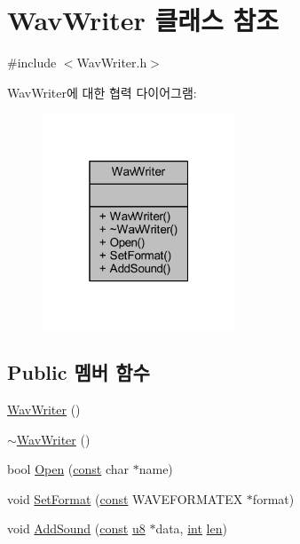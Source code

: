 \hypertarget{class_wav_writer}{}\section{Wav\+Writer 클래스 참조}
\label{class_wav_writer}


{\ttfamily \#include $<$Wav\+Writer.\+h$>$}



Wav\+Writer에 대한 협력 다이어그램\+:\nopagebreak
\begin{figure}[H]
\begin{center}
\leavevmode
\includegraphics[width=163pt]{class_wav_writer__coll__graph}
\end{center}
\end{figure}
\subsection*{Public 멤버 함수}
\begin{DoxyCompactItemize}
\item 
\mbox{\hyperlink{class_wav_writer_ada0f985bd68570f6d55442f96f3bda44}{Wav\+Writer}} ()
\item 
\mbox{\hyperlink{class_wav_writer_a53a03ef60fc6635381d059beaa6f0657}{$\sim$\+Wav\+Writer}} ()
\item 
bool \mbox{\hyperlink{class_wav_writer_a18a057d0c1901caa6b08f528bd6908a7}{Open}} (\mbox{\hyperlink{getopt1_8c_a2c212835823e3c54a8ab6d95c652660e}{const}} char $\ast$name)
\item 
void \mbox{\hyperlink{class_wav_writer_a04fe7187eebeff2831af0bc85470744d}{Set\+Format}} (\mbox{\hyperlink{getopt1_8c_a2c212835823e3c54a8ab6d95c652660e}{const}} W\+A\+V\+E\+F\+O\+R\+M\+A\+T\+EX $\ast$format)
\item 
void \mbox{\hyperlink{class_wav_writer_a2033f614c70ac3e59d07fb43ea26577a}{Add\+Sound}} (\mbox{\hyperlink{getopt1_8c_a2c212835823e3c54a8ab6d95c652660e}{const}} \mbox{\hyperlink{_system_8h_aed742c436da53c1080638ce6ef7d13de}{u8}} $\ast$data, \mbox{\hyperlink{_util_8cpp_a0ef32aa8672df19503a49fab2d0c8071}{int}} \mbox{\hyperlink{expr-lex_8cpp_afed088663f8704004425cdae2120b9b3}{len}})
\end{DoxyCompactItemize}


